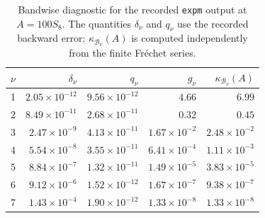 \begin{table}[tb]
\caption{Bandwise diagnostic for the recorded \texttt{expm} output at
$A=100S_8$. The quantities $\delta_\nu$ and $q_\nu$ use the recorded
backward error; $\kappa_{\mathcal B_\nu}(A)$ is computed independently
from the finite Fr\'echet series.}
\label{tab:superdiag}
\centering\small
\setlength{\tabcolsep}{5pt}
\begin{tabular}{crrrr}
$\nu$ & $\delta_\nu$ & $q_\nu$ & $g_\nu$ & $\kappa_{\mathcal B_\nu}(A)$\\
\hline
1 & $2.05\times10^{-12}$ & $9.56\times10^{-12}$ & $4.66$ & $6.99$\\
2 & $8.49\times10^{-11}$ & $2.68\times10^{-11}$ & $0.32$ & $0.45$\\
3 & $2.47\times10^{-9}$ & $4.13\times10^{-11}$ & $1.67\times10^{-2}$ & $2.48\times10^{-2}$\\
4 & $5.54\times10^{-8}$ & $3.55\times10^{-11}$ & $6.41\times10^{-4}$ & $1.11\times10^{-3}$\\
5 & $8.84\times10^{-7}$ & $1.32\times10^{-11}$ & $1.49\times10^{-5}$ & $3.83\times10^{-5}$\\
6 & $9.12\times10^{-6}$ & $1.52\times10^{-12}$ & $1.67\times10^{-7}$ & $9.38\times10^{-7}$\\
7 & $1.43\times10^{-4}$ & $1.90\times10^{-12}$ & $1.33\times10^{-8}$ & $1.33\times10^{-8}$\\
\end{tabular}
\end{table}
